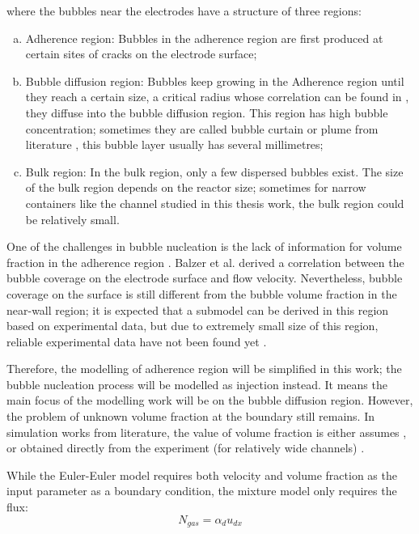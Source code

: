 where the bubbles near the electrodes have a structure of three regions:

\begin{enumerate}[(a)]
    \item Adherence region: Bubbles in the adherence region are first produced at certain sites of cracks on the electrode surface;
    \item Bubble diffusion region: Bubbles keep growing in the Adherence region until they reach a certain size, a critical radius whose correlation can be found in \cite{Energy}, they diffuse into the bubble diffusion region. This region has high bubble concentration; sometimes they are called bubble curtain or plume from literature \cite{Balzer2002, Darmana2005}, this bubble layer usually has several millimetres;
    \item Bulk region: In the bulk region, only a few dispersed bubbles exist. The size of the bulk region depends on the reactor size; sometimes for narrow containers like the channel studied in this thesis work, the bulk region could be relatively small. 
\end{enumerate}

One of the challenges in bubble nucleation is the lack of information for volume fraction in the adherence region \cite{Alexiadis2011, Alexiadis2012, Alexiadis2012a, Alexiadis2012b}. Balzer et al. \cite{Balzer2002} derived a correlation between the bubble coverage on the electrode surface and flow velocity. Nevertheless, bubble coverage on the surface is still different from the bubble volume fraction in the near-wall region; it is expected that a submodel can be derived in this region based on experimental data, but due to extremely small size of this region, reliable experimental data have not been found yet \cite{Hreiz2015}. 

Therefore, the modelling of adherence region will be simplified in this work; the bubble nucleation process will be modelled as injection instead. It means the main focus of the modelling work will be on the bubble diffusion region. However, the problem of unknown volume fraction at the boundary still remains. In simulation works from literature, the value of volume fraction is either assumes \cite{Alexiadis2011, Alexiadis2012, Alexiadis2012a, Alexiadis2012b}, or obtained directly from the experiment (for relatively wide channels) \cite{Mat2005}.

While the Euler-Euler model requires both velocity and volume fraction as the input parameter as a boundary condition, the mixture model only requires the flux:
\begin{equation}\label{eq:gasflux}
    N_{gas} = \alpha_d u_{dx}
\end{equation}

